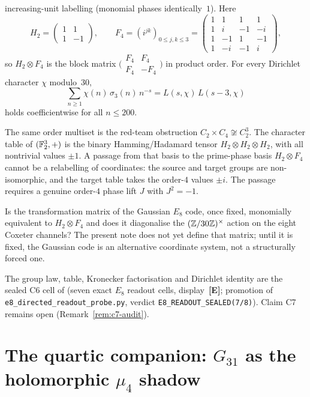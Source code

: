 increasing-unit labelling (monomial phases identically~$1$).  Here
\[
H_2=\begin{pmatrix}1&1\\1&-1\end{pmatrix},\qquad
F_4=(i^{jk})_{0\le j,k\le 3}
=\begin{pmatrix}
1&1&1&1\\
1&i&-1&-i\\
1&-1&1&-1\\
1&-i&-1&i
\end{pmatrix},
\]
so $H_2\otimes F_4$ is the block matrix
$\bigl(\begin{smallmatrix}F_4&F_4\\ F_4&-F_4\end{smallmatrix}\bigr)$
in product order.  For every Dirichlet character $\chi$ modulo~$30$,
\[
\sum_{n\ge1}\chi(n)\,\sigma_3(n)\,n^{-s}
=L(s,\chi)\,L(s-3,\chi)
\]
holds coefficientwise for all $n\le200$.

The same order multiset is the red-team obstruction
$C_2\times C_4\not\cong C_2^3$.  The character table of
$(\mathbb F_2^3,+)$ is the binary Hamming/Hadamard tensor
$H_2\otimes H_2\otimes H_2$, with all nontrivial values $\pm1$.  A
passage from that basis to the prime-phase basis $H_2\otimes F_4$
cannot be a relabelling of coordinates: the source and target groups
are non-isomorphic, and the target table takes the order-$4$ values
$\pm i$.  The passage requires a genuine order-$4$ phase lift $J$
with $J^2=-1$.

\begin{remark}
\label{rem:c7-audit}
Is the transformation matrix of the Gaussian $E_8$ code, once
fixed, monomially equivalent to $H_2\otimes F_4$ and does it
diagonalise the $(\mathbb Z/30\mathbb Z)^{\times}$ action on the eight Coxeter
channels?  The present note does not yet define that matrix;
until it is fixed, the Gaussian code is an alternative coordinate
system, not a structurally forced one.
\end{remark}

The group law, table, Kronecker factorisation and Dirichlet identity
are the sealed C6 cell of
(seven exact $E_8$ readout cells, display~\textbf{[E]}; promotion of
\texttt{e8\_directed\_readout\_probe.py}, verdict
\texttt{E8\_READOUT\_SEALED(7/8)}).
Claim C7 remains open (Remark~\ref{rem:c7-audit}).

\section{The quartic companion:
\texorpdfstring{$G_{31}$}{G31} as the holomorphic
\texorpdfstring{$\mu_4$}{mu4} shadow}\label{sec:quartic}

